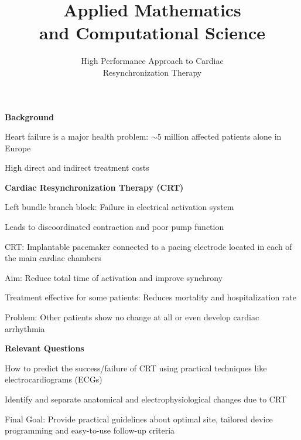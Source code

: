 \documentclass[20pt]{ICSPoster}
\title{Applied Mathematics\\[0.2cm]and Computational Science}
\subtitle{High Performance Approach to Cardiac\\ Resynchronization Therapy}
\begin{document}
  \maketitle %

  \begin{posterbox}[2]
    \begin{headerbox}[
        title=Background: Understanding Cardiac Resynchronization Therapy,
        height=0.25\textheight,
        width=0.47\textwidth]
      \begin{minipage}{\textwidth}\sf
        \textbf{Background}
        \vspace{1mm}
        \begin{compactitem}
          \item Heart failure is a major health problem: $\sim 5$ million affected patients alone in Europe
          \item High direct and indirect treatment costs
        \end{compactitem}
      \end{minipage}

      \vspace{0.5cm}

      \begin{minipage}{0.55\textwidth}\sf
        \textbf{Cardiac Resynchronization Therapy (CRT)}
        \begin{compactitem}
          \item Left bundle branch block: Failure in electrical activation system
          \item Leads to discoordinated contraction and poor pump function
          \item CRT: Implantable pacemaker connected to a pacing electrode
                located in each of the main cardiac chambers
          \item Aim: Reduce total time of activation and improve synchrony
          \item Treatment effective for some patients: Reduces mortality and hospitalization rate
          \item Problem: Other patients show no change at all or even develop cardiac arrhythmia
        \end{compactitem}

        \vspace{0.5cm}

        \textbf{Relevant Questions}
        \begin{compactitem}
          \item How to predict the success/failure of CRT using practical techniques like electrocardiograms (ECGs)
          \item Identify and separate anatomical and electrophysiological changes due to CRT
          \item Final Goal: Provide practical guidelines about optimal site, tailored device programming
                and easy-to-use follow-up criteria
        \end{compactitem}


\end{minipage}
\end{headerbox}
\end{posterbox}
\end{document}
